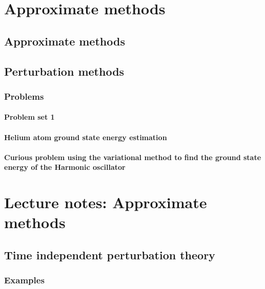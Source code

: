 %   
\part{Approximate methods}
   \chapter{Approximate methods}
      
   \chapter{Perturbation methods}
      
      \section{Problems}
         \subsection{Problem set 1}
            
         \subsection{Helium atom ground state energy estimation}
            
         \subsection{Curious problem using the variational method to find the ground state energy of the Harmonic oscillator}
            
\part{Lecture notes: Approximate methods}
   \chapter{Time independent perturbation theory}
      
      
      
      \section{Examples}
         
            \shipoutAnswer
